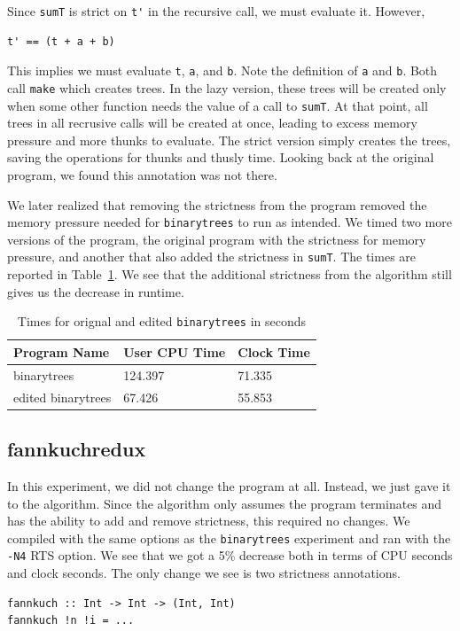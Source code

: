 \documentclass[preprint,nocopyrightspace]{sigplanconf}
\begin{document}
Since \lstinline!sumT! is strict on \lstinline!t'! in the recursive call, we must evaluate it. However,
\begin{lstlisting}
t' == (t + a + b)
\end{lstlisting}
This implies we must evaluate \lstinline!t!, \lstinline!a!, and \lstinline!b!. Note the definition of \lstinline!a! and \lstinline!b!. Both call \lstinline!make! which creates trees. In the lazy version, these trees will be created only when some other function needs the value of a call to \lstinline!sumT!. At that point, all trees in all recrusive calls will be created at once, leading to excess memory pressure and more thunks to evaluate. The strict version simply creates the trees, saving the operations for thunks and thusly time. Looking back at the original program, we found this annotation was not there. 

We later realized that removing the strictness from the program removed the memory pressure needed for \lstinline!binarytrees! to run as intended. We timed two more versions of the program, the original program with the strictness for memory pressure, and another that also added the strictness in \lstinline!sumT!. The times are reported in Table~\ref{tab:btree}. We see that the additional strictness from the algorithm still gives us the decrease in runtime.
\begin{table}[t]
\label{tab:btree}
\begin{tabular}{| l | l | l |}
\hline
Program Name & User CPU Time & Clock Time\\
\hline
binarytrees & 124.397 & 71.335\\
\hline
edited binarytrees & 67.426 & 55.853\\
\hline
\end{tabular}
\caption{Times for orignal and edited \lstinline!binarytrees! in seconds}
\end{table}
\subsection{fannkuchredux}
In this experiment, we did not change the program at all. Instead, we just gave it to the algorithm. Since the algorithm only assumes the program terminates and has the ability to add and remove strictness, this required no changes. We compiled with the same options as the \lstinline!binarytrees! experiment and ran with the \lstinline!-N4! RTS option. We see that we got a 5\% decrease both in terms of CPU seconds and clock seconds. The only change we see is two strictness annotations.
\begin{lstlisting}
fannkuch :: Int -> Int -> (Int, Int)
fannkuch !n !i = ...
\end{lstlisting}
\end{document}
